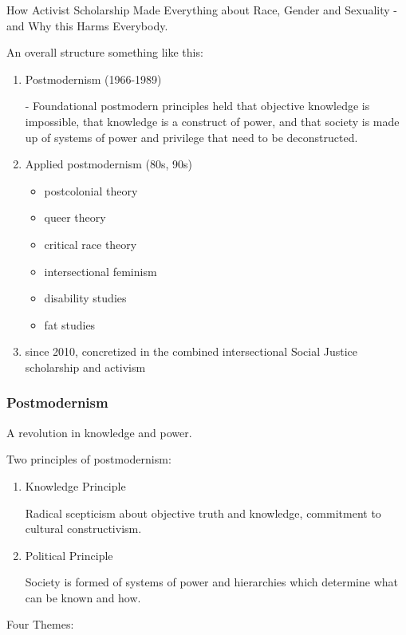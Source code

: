 \documentclass[10pt,titlepage]{book}
\begin{document}
How Activist Scholarship Made Everything about Race, Gender and Sexuality - and Why this Harms Everybody.

An overall structure something like this:

\begin{enumerate}

\item Postmodernism (1966-1989)

   - Foundational postmodern principles held that objective knowledge is impossible, that knowledge is a construct of power, and that society is made up of systems of power and privilege that need to be deconstructed.

\item Applied postmodernism (80s, 90s)

  \begin{itemize}
  \item postcolonial theory
  \item queer theory
  \item critical race theory
  \item intersectional feminism
  \item disability studies
  \item fat studies
  \end{itemize}

\item since 2010, concretized in the combined intersectional Social Justice scholarship and activism
\end{enumerate}


\subsubsection{Postmodernism}
A revolution in knowledge and power.

Two principles of postmodernism:

\begin{enumerate}
\item Knowledge Principle

  Radical scepticism about objective truth and knowledge, commitment to cultural constructivism.
  
\item Political Principle

  Society is formed of systems of power and hierarchies which determine what can be known and how.
  \end{enumerate}

Four Themes:
\end{document}
